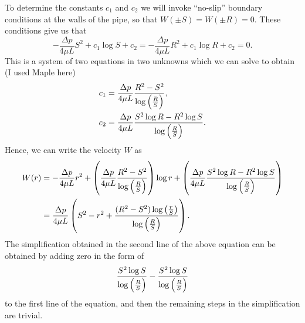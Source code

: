 \documentclass{article}
\begin{document}
To determine the constants $c_1$ and $c_2$ we will invoke ``no-slip''
boundary conditions at the walls of the pipe, so that $W(\pm S) = W(\pm
R) = 0$. These conditions give us that
%
\begin{equation*}
    - \frac{\Delta p}{4 \mu L} S^2 + c_1 \log S + c_2
    = - \frac{\Delta p}{4 \mu L} R^2 + c_1 \log R + c_2
    = 0
    .
\end{equation*}
%
This is a system of two equations in two unknowns which we can solve to
obtain (I used Maple here)
%
\begin{align*}
    c_1 &= \frac{\Delta p}{4 \mu L} \frac{R^2 - S^2}{\log\del{\frac{R}{S}}}, \\
    c_2 &= \frac{\Delta p}{4 \mu L} \frac{S^2 \log R - R^2 \log S}{\log\del{\frac{R}{S}}}
    .
\end{align*}
%
Hence, we can write the velocity $W$ as
%
\begin{align*}
    W(r) &= - \frac{\Delta p}{4 \mu L} r^2
        + \del{\frac{\Delta p}{4 \mu L} \frac{R^2 - S^2}{\log\del{\frac{R}{S}}}} \log r
        + \del{\frac{\Delta p}{4 \mu L} \frac{S^2 \log R - R^2 \log S}{\log\del{\frac{R}{S}}}} \\
         &= \frac{\Delta p}{4 \mu L} \del{S^2 - r^2 + \frac{(R^2 - S^2) \log\del{\frac{r}{S}}}{\log\del{\frac{R}{S}}}}
    .
\end{align*}
%
The simplification obtained in the second line of the above equation can
be obtained by adding zero in the form of
%
\begin{equation*}
    \frac{S^2 \log{S}}{\log\del{\frac{R}{S}}}
    - \frac{S^2 \log{S}}{\log\del{\frac{R}{S}}}
\end{equation*}
%
to the first line of the equation, and then the remaining steps in the
simplification are trivial.
\end{document}
